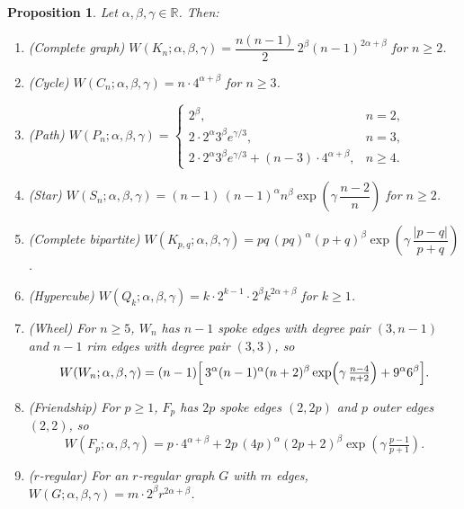 \documentclass[11pt,a4paper]{article}
\newtheorem{proposition}[theorem]{Proposition}
\theoremstyle{definition}
\newcommand{\Wuzi}{W(G;\alpha,\beta,\gamma)}
\begin{document}
\begin{proposition}\label{prop:closedforms}
Let $\alpha,\beta,\gamma\in\mathbb{R}$. Then:
\begin{enumerate}
\item (Complete graph) $W(K_n;\alpha,\beta,\gamma) =
  \dfrac{n(n-1)}{2}\,2^{\beta}(n-1)^{2\alpha+\beta}$ for $n\ge 2$.
\item (Cycle) $W(C_n;\alpha,\beta,\gamma) = n\cdot 4^{\alpha+\beta}$
  for $n\ge 3$.
\item (Path)
  $W(P_n;\alpha,\beta,\gamma) =
  \begin{cases}
    2^{\beta}, & n=2,\\[2pt]
    2\cdot 2^{\alpha}3^{\beta}e^{\gamma/3}, & n=3,\\[2pt]
    2\cdot 2^{\alpha}3^{\beta}e^{\gamma/3} + (n-3)\cdot 4^{\alpha+\beta},
       & n\ge 4.
  \end{cases}$
\item (Star) $W(S_n;\alpha,\beta,\gamma) =
  (n-1)\,(n-1)^{\alpha} n^{\beta} \exp\!\left(\gamma\,\dfrac{n-2}{n}\right)$
  for $n\ge 2$.
\item (Complete bipartite) $W(K_{p,q};\alpha,\beta,\gamma) =
  pq\,(pq)^{\alpha}(p+q)^{\beta}\exp\!\left(\gamma\,\dfrac{|p-q|}{p+q}\right)$.
\item (Hypercube) $W(Q_k;\alpha,\beta,\gamma) =
  k\cdot 2^{k-1}\cdot 2^{\beta} k^{2\alpha+\beta}$ for $k\ge 1$.
\item (Wheel) For $n\ge 5$, $W_n$ has $n-1$ spoke edges with degree
  pair $(3,n-1)$ and $n-1$ rim edges with degree pair $(3,3)$, so
  \[
  W(W_n;\alpha,\beta,\gamma)=
  (n-1)\Bigl[\,3^\alpha (n-1)^\alpha (n+2)^\beta
     \exp\!\left(\gamma\,\tfrac{n-4}{n+2}\right)
     +9^\alpha 6^\beta\Bigr].
  \]
\item (Friendship) For $p\ge 1$, $F_p$ has $2p$ spoke edges
  $(2,2p)$ and $p$ outer edges $(2,2)$, so
  \[
  W(F_p;\alpha,\beta,\gamma)=
  p\cdot 4^{\alpha+\beta}
  +2p\,(4p)^{\alpha}(2p+2)^{\beta}
     \exp\!\left(\gamma\,\tfrac{p-1}{p+1}\right).
  \]
\item ($r$-regular) For an $r$-regular graph $G$ with $m$ edges,
  $\Wuzi=m\cdot 2^{\beta} r^{2\alpha+\beta}$.
\end{enumerate}
\end{proposition}
\end{document}
